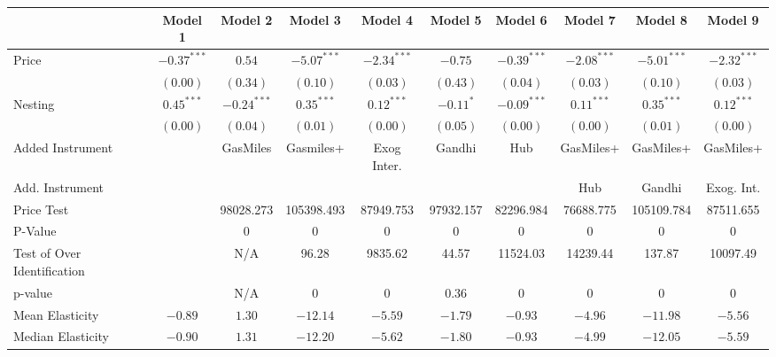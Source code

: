 
\begin{tabular}{l c c c c c c c c c}
\toprule
 & Model 1 & Model 2 & Model 3 & Model 4 & Model 5 & Model 6 & Model 7 & Model 8 & Model 9 \\
\midrule
Price                       & $-0.37^{***}$ & $0.54$        & $-5.07^{***}$ & $-2.34^{***}$ & $-0.75$     & $-0.39^{***}$ & $-2.08^{***}$ & $-5.01^{***}$ & $-2.32^{***}$ \\
                            & $(0.00)$      & $(0.34)$      & $(0.10)$      & $(0.03)$      & $(0.43)$    & $(0.04)$      & $(0.03)$      & $(0.10)$      & $(0.03)$      \\
Nesting                     & $0.45^{***}$  & $-0.24^{***}$ & $0.35^{***}$  & $0.12^{***}$  & $-0.11^{*}$ & $-0.09^{***}$ & $0.11^{***}$  & $0.35^{***}$  & $0.12^{***}$  \\
                            & $(0.00)$      & $(0.04)$      & $(0.01)$      & $(0.00)$      & $(0.05)$    & $(0.00)$      & $(0.00)$      & $(0.01)$      & $(0.00)$      \\
\midrule
Added Instrument            &               & GasMiles      & Gasmiles+     & Exog Inter.   & Gandhi      & Hub           & GasMiles+     & GasMiles+     & GasMiles+     \\
Add. Instrument             &               &               &               &               &             &               & Hub           & Gandhi        & Exog. Int.    \\
Price Test                  &               & 98028.273     & 105398.493    & 87949.753     & 97932.157   & 82296.984     & 76688.775     & 105109.784    & 87511.655     \\
P-Value                     &               & 0             & 0             & 0             & 0           & 0             & 0             & 0             & 0             \\
Test of Over Identification &               & N/A           & 96.28         & 9835.62       & 44.57       & 11524.03      & 14239.44      & 137.87        & 10097.49      \\
p-value                     &               & N/A           & 0             & 0             & 0.36        & 0             & 0             & 0             & 0             \\
Mean Elasticity             & $-0.89$       & $1.30$        & $-12.14$      & $-5.59$       & $-1.79$     & $-0.93$       & $-4.96$       & $-11.98$      & $-5.56$       \\
Median Elasticity           & $-0.90$       & $1.31$        & $-12.20$      & $-5.62$       & $-1.80$     & $-0.93$       & $-4.99$       & $-12.05$      & $-5.59$       \\

\end{tabular}
